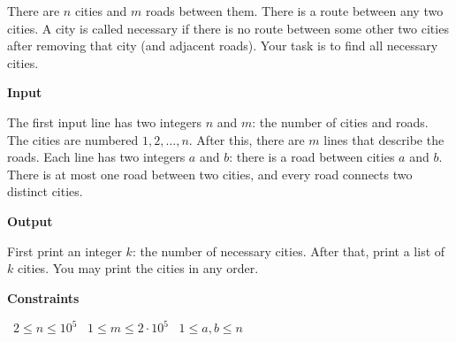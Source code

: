 There are $n$ cities and $m$ roads between them. There is a route between any two cities.
A city is called necessary if there is no route between some other two cities after removing that city (and adjacent roads). Your task is to find all necessary cities.

\vspace{0.3cm}\noindent\textbf{Input}

The first input line has two integers $n$ and $m$: the number of cities and roads. The cities are numbered $1,2,\dots,n$.
After this, there are $m$ lines that describe the roads. Each line has two integers $a$ and $b$: there is a road between cities $a$ and $b$. There is at most one road between two cities, and every road connects two distinct cities.

\vspace{0.3cm}\noindent\textbf{Output}

First print an integer $k$: the number of necessary cities. After that, print a list of $k$ cities. You may print the cities in any order.

\vspace{0.3cm}\noindent\textbf{Constraints}

\textbullet\ $2 \le n \le 10^5$
\textbullet\ $1 \le m \le 2 \cdot 10^5$
\textbullet\ $1 \le a,b \le n$